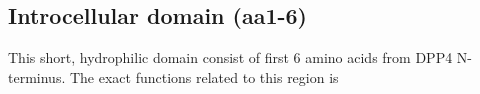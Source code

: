 \subsection{Introcellular domain (aa1-6)}


This short, hydrophilic domain consist of first 6 amino acids from DPP4 N-terminus. The exact functions related to this region is
